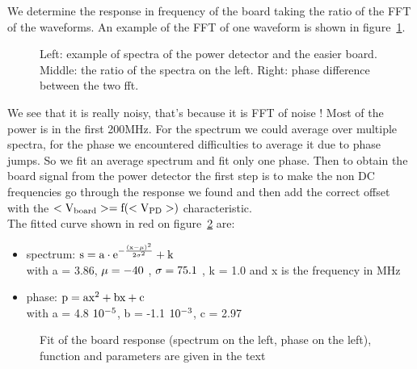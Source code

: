 We determine the  response in frequency of the  board taking the ratio
of the FFT of the waveforms.  An example of the FFT of one waveform is
shown in figure~\ref{fig:examplefft}.
\begin{figure}[!ht]
  \centering
  \hspace*{-3ex}
  \caption{Left:  example of  spectra of  the power  detector  and the
    easier board. Middle: the ratio of the spectra on the left. Right:
    phase difference between the two fft.}
  \label{fig:examplefft}
\end{figure}
We see that  it is really noisy,  that's because it is FFT  of noise !
Most of  the power is in the  first 200MHz. For the  spectrum we could
average  over   multiple  spectra,   for  the  phase   we  encountered
difficulties to average  it due to phase jumps.  So  we fit an average
spectrum and fit only one phase.  Then to obtain the board signal from
the power detector the first step is to make the non DC frequencies go
through the response we found and then add the correct offset with the
$\rm <V_{board}>  = f(<V_{PD}>)$ characteristic.  \\  The fitted curve
shown in red on figure~\ref{fig:fitboard} are:
\begin{samepage}
  \begin{itemize}
  \item spectrum:  $\rm s = a\cdot  e^{-\frac{(x-\mu)^2}{2\sigma^2}} + k
    $\\ with a =  3.86, $\rm \mu = -40$ , $\rm \sigma =  75.1$ , k = 1.0
    and x is the frequency in MHz
  \item phase: $\rm p = ax^2 + bx + c $ \\ with a = 4.8 $\rm 10^{-5}$, b
    = -1.1 $\rm 10^{-3}$, c = 2.97
  \end{itemize}
\end{samepage}

\begin{figure}[!ht]
  \centering
  \hspace*{-3ex}
  \caption{Fit of the board response (spectrum on the left, phase on the left), function and parameters are given in the text}
  \label{fig:fitboard}
\end{figure}

